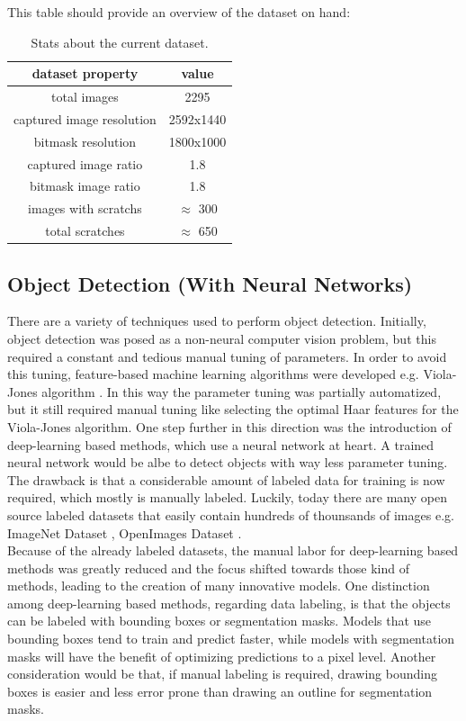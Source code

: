 This table should provide an overview of the dataset on hand:
\begin{table}[!h]
\centering
\begin{tabular}{ ||c|c||}
\hline
dataset property & value \\ [0.5ex]
\hline\hline
total images & 2295 \\
captured image resolution & 2592x1440 \\
bitmask resolution & 1800x1000 \\
captured image ratio & 1.8 \\
bitmask image ratio & 1.8 \\
images with scratchs & $\approx$ 300 \\
total scratches & $\approx$ 650 \\
\hline
\end{tabular}
\label{asdfsdfdf}
\caption{Stats about the current dataset.}
\end{table}


\subsection{Object Detection (With Neural Networks)}
There are a variety of techniques used to perform object detection. Initially, object detection was posed as a non-neural computer vision problem, but this required a constant and tedious manual tuning of parameters. In order to avoid this tuning, feature-based machine learning algorithms were developed e.g. Viola-Jones algorithm  \cite{viola_joines_paper}. In this way the parameter tuning was partially automatized, but it still required manual tuning like selecting the optimal Haar features for the Viola-Jones algorithm.
One step further in this direction was the introduction of deep-learning based methods, which use a neural network at heart. A trained neural network would be albe to detect objects with way less parameter tuning. The drawback is that a considerable amount of labeled data for training is now required, which mostly is manually labeled. Luckily, today there are many open source labeled datasets that easily contain hundreds of thounsands of images e.g. ImageNet Dataset \cite{imagenet_site}, OpenImages Dataset \cite{openimages_site}. \\
Because of the already labeled datasets, the manual labor for deep-learning based methods was greatly reduced and the focus shifted towards those kind of methods, leading to the creation of many innovative models. One distinction among deep-learning based methods, regarding data labeling, is that the objects can be labeled with bounding boxes or segmentation masks. Models that use bounding boxes tend to train and predict faster, while models with segmentation masks will have the benefit of optimizing predictions to a pixel level. Another consideration would be that, if manual labeling is required, drawing bounding boxes is easier and less error prone than drawing an outline for segmentation masks. \\

